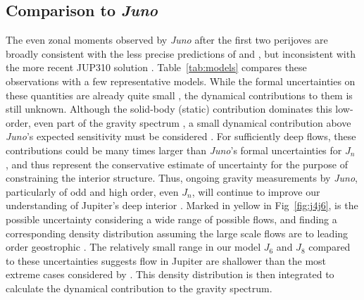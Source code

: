 \subsection{Comparison to \textit{Juno}} \label{sec:comparison}


The even zonal moments observed by \textit{Juno} after the first two perijoves
\citep{Folkner2017} are broadly consistent with the less precise predictions of
\citet{Campbell1985} and \citet{Jacobson2003}, but inconsistent with the more
recent JUP310 solution \citep{Jacobson2013}.  Table~\ref{tab:models} compares
these observations with a few representative models. 
While the formal
uncertainties on these quantities are already quite small \citep{Folkner2017}, the dynamical
contributions to them is still unknown. 
Although the solid-body (static) contribution dominates this low-order, even
part of the gravity spectrum \citep{Hubbard1999}, a small dynamical
contribution above \textit{Juno}'s expected sensitivity must be considered
\citep{Kaspi2010}.  For sufficiently deep flows, these contributions could be
many times larger than \textit{Juno}'s formal uncertainties for $J_n$
\citep{Kaspi2017}, and thus represent the conservative estimate of uncertainty
for the purpose of constraining the interior structure. Thus, ongoing gravity
measurements by \textit{Juno}, particularly of odd and high order, even $J_n$,
will continue to improve our understanding of Jupiter's deep interior
\citep{Kaspi2013}.  Marked in yellow in Fig~\ref{fig:j4j6}, is the possible
uncertainty considering a wide range of possible flows, and finding a
corresponding density distribution assuming the large scale flows are to
leading order geostrophic \citep{Kaspi2009}.  The relatively small range in our
model $J_6$ and $J_8$ compared to these uncertainties suggests flow in Jupiter
are shallower than the most extreme cases considered by \citet{Kaspi2017}. 
This density
distribution is then integrated to calculate the dynamical contribution to the
gravity spectrum.

